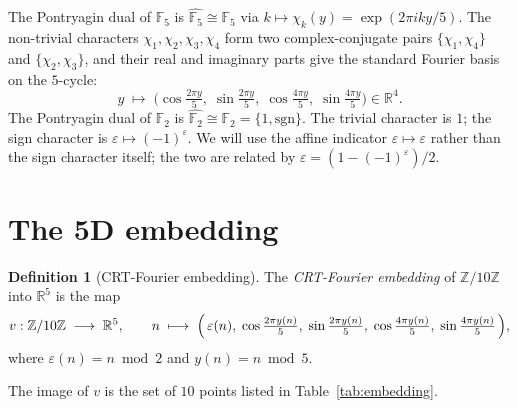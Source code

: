\documentclass[11pt,reqno]{amsart}
\theoremstyle{definition}
\newtheorem{definition}[theorem]{Definition}
\newcommand{\Z}{\mathbb{Z}}
\newcommand{\R}{\mathbb{R}}
\newcommand{\F}{\mathbb{F}}
\begin{document}
The Pontryagin dual of $\F_5$ is $\widehat{\F_5}
\cong \F_5$ via $k \mapsto \chi_k(y) = \exp(2\pi i k y / 5)$.
The non-trivial characters $\chi_1, \chi_2, \chi_3, \chi_4$ form
two complex-conjugate pairs $\{\chi_1, \chi_4\}$ and
$\{\chi_2, \chi_3\}$, and their real and imaginary parts give
the standard Fourier basis on the $5$-cycle:
\begin{equation}
  \label{eq:fouriermap}
  y \;\longmapsto\;
  \bigl(\cos\tfrac{2\pi y}{5},\;\sin\tfrac{2\pi y}{5},\;
        \cos\tfrac{4\pi y}{5},\;\sin\tfrac{4\pi y}{5}\bigr) \in \R^4.
\end{equation}
The Pontryagin dual of $\F_2$ is $\widehat{\F_2} \cong
\F_2 = \{1, \mathrm{sgn}\}$. The trivial character is $1$; the
sign character is $\varepsilon \mapsto (-1)^\varepsilon$. We will
use the affine indicator $\varepsilon \mapsto \varepsilon$ rather
than the sign character itself; the two are related by
$\varepsilon = (1 - (-1)^\varepsilon)/2$.

\section{The 5D embedding}
\label{sec:embedding}

\begin{definition}[CRT-Fourier embedding]
\label{def:embedding}
The \emph{CRT-Fourier embedding} of $\Z/10\Z$ into $\R^5$ is the map
\[
  v : \Z/10\Z \;\longrightarrow\; \R^5,
  \qquad
  n \;\longmapsto\;
  \Bigl(\,\varepsilon(n),\;
  \cos\tfrac{2\pi y(n)}{5},\;\sin\tfrac{2\pi y(n)}{5},\;
  \cos\tfrac{4\pi y(n)}{5},\;\sin\tfrac{4\pi y(n)}{5}\,\Bigr),
\]
where $\varepsilon(n) = n \bmod 2$ and $y(n) = n \bmod 5$.
\end{definition}

The image of $v$ is the set of $10$ points listed in
Table~\ref{tab:embedding}.
\end{document}
